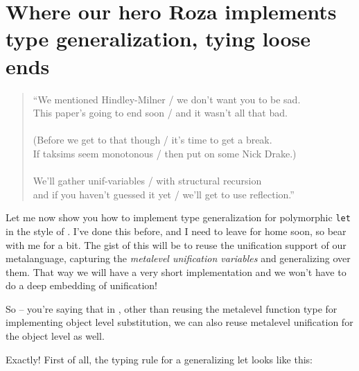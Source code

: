 \section{Where our hero Roza implements type generalization, tying loose
ends}\label{where-our-hero-roza-implements-type-generalization-tying-loose-ends}

\begin{verse}
``We mentioned Hindley-Milner / we don't want you to be sad. \\
This paper's going to end soon / and it wasn't all that bad. \\
\hspace{1em}\vspace{-0.5em} \\
(Before we get to that though / it's time to get a break. \\
If taksims seem monotonous / then put on some Nick Drake.) \\
\hspace{1em}\vspace{-0.5em} \\
We'll gather unif-variables / with structural recursion \\
and if you haven't guessed it yet / we'll get to use reflection.''
\end{verse}

\heroADVISOR{} Let me now show you how to implement type generalization for
polymorphic \texttt{let} in the style of
\citet{damas1984type,hindley1969principal,milner1978theory}. I've done
this before, and I need to leave for home soon, so bear with me for a
bit. The gist of this will be to reuse the unification support of our
metalanguage, capturing the \emph{metalevel unification variables} and
generalizing over them. That way we will have a very short
implementation and we won't have to do a deep embedding of unification!

\heroSTUDENT{} So -- you're saying that in \lamprolog, other than reusing the
metalevel function type for implementing object level substitution, we
can also reuse metalevel unification for the object level as well.

\identNormal

\heroADVISOR{} Exactly! First of all, the typing rule for a generalizing let
looks like this:

\vspace{-1.2em}\begin{mathpar}
\end{mathpar}


